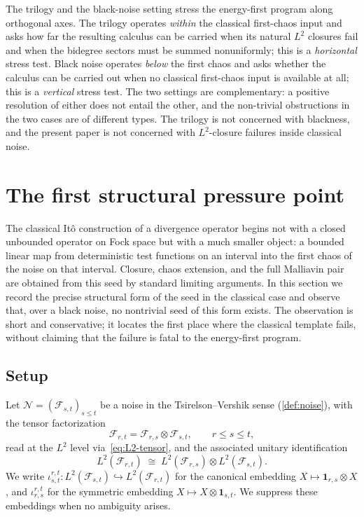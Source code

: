 \documentclass[11pt,reqno]{amsart}
\theoremstyle{plain}
\theoremstyle{definition}
\theoremstyle{remark}
\begin{document}
The trilogy and the black-noise setting stress the energy-first
program along orthogonal axes. The trilogy operates \emph{within}
the classical first-chaos input and asks how far the resulting
calculus can be carried when its natural $L^2$ closures fail and
when the bidegree sectors must be summed nonuniformly; this is a
\emph{horizontal} stress test. Black noise operates \emph{below} the
first chaos and asks whether the calculus can be carried out when
no classical first-chaos input is available at all; this is a
\emph{vertical} stress test. The two settings are complementary: a
positive resolution of either does not entail the other, and the
non-trivial obstructions in the two cases are of different types.
The trilogy is not concerned with blackness, and the present paper
is not concerned with $L^2$-closure failures inside classical noise.

\section{The first structural pressure point}\label{sec:seed}

The classical It\^o construction of a divergence operator begins not
with a closed unbounded operator on Fock space but with a much
smaller object: a bounded linear map from deterministic test
functions on an interval into the first chaos of the noise on that
interval. Closure, chaos extension, and the full Malliavin pair are
obtained from this seed by standard limiting arguments. In this
section we record the precise structural form of the seed in the
classical case and observe that, over a black noise, no nontrivial
seed of this form exists. The observation is short and conservative;
it locates the first place where the classical template fails,
without claiming that the failure is fatal to the energy-first
program.

\subsection{Setup}\label{sec:seed-setup}

Let $\mathcal N=(\mathcal F_{s,t})_{s\le t}$ be a noise in the
Tsirelson--Vershik sense (\cref{def:noise}), with the tensor
factorization
\begin{equation}\label{eq:tensor-factorization}
  \mathcal F_{r,t}=\mathcal F_{r,s}\otimes\mathcal F_{s,t},
  \qquad r\le s\le t,
\end{equation}
read at the $L^2$ level via~\eqref{eq:L2-tensor}, and the associated
unitary identification
\[
  L^2(\mathcal F_{r,t})\;\cong\;L^2(\mathcal F_{r,s})\otimes L^2(\mathcal F_{s,t}).
\]
We write $\iota^{r,t}_{s,t}\colon L^2(\mathcal F_{s,t})\hookrightarrow L^2(\mathcal F_{r,t})$
for the canonical embedding $X\mapsto\mathbf 1_{r,s}\otimes X$, and
$\iota^{r,t}_{r,s}$ for the symmetric embedding
$X\mapsto X\otimes\mathbf 1_{s,t}$. We suppress these embeddings
when no ambiguity arises.
\end{document}
